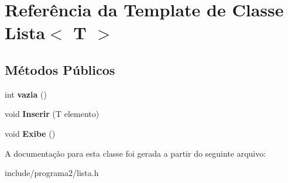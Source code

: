 \hypertarget{class_lista}{}\section{Referência da Template de Classe Lista$<$ T $>$}
\label{class_lista}
\subsection*{Métodos Públicos}
\begin{DoxyCompactItemize}
\item 
\mbox{\label{class_lista_a09ee8e14eff14b176af5768f2408fc8d}} 
int {\bfseries vazia} ()
\item 
\mbox{\label{class_lista_aa535f2089cb6c257949d978e602d9cb6}} 
void {\bfseries Inserir} (T elemento)
\item 
\mbox{\label{class_lista_a3140b03892f5fbeeac0bbb704650aa93}} 
void {\bfseries Exibe} ()
\end{DoxyCompactItemize}


A documentação para esta classe foi gerada a partir do seguinte arquivo\+:\begin{DoxyCompactItemize}
\item 
include/programa2/lista.\+h\end{DoxyCompactItemize}
